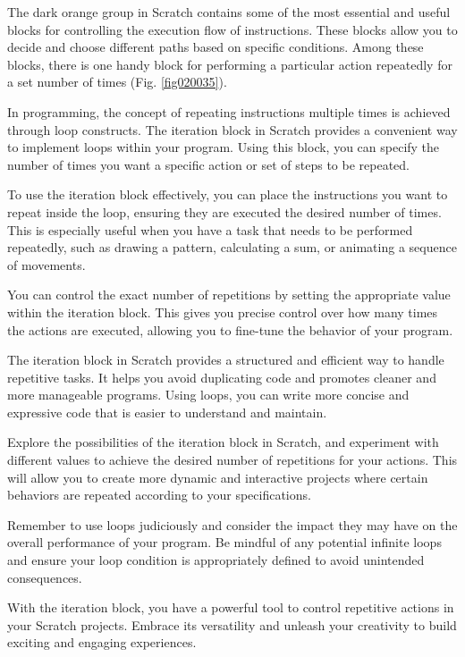 The dark orange group in Scratch contains some of the most essential and useful blocks for controlling the execution flow of instructions. These blocks allow you to decide and choose different paths based on specific conditions. Among these blocks, there is one handy block for performing a particular action repeatedly for a set number of times (Fig. \ref{fig020035}).

In programming, the concept of repeating instructions multiple times is achieved through loop constructs. The iteration block in Scratch provides a convenient way to implement loops within your program. Using this block, you can specify the number of times you want a specific action or set of steps to be repeated.

To use the iteration block effectively, you can place the instructions you want to repeat inside the loop, ensuring they are executed the desired number of times. This is especially useful when you have a task that needs to be performed repeatedly, such as drawing a pattern, calculating a sum, or animating a sequence of movements.

You can control the exact number of repetitions by setting the appropriate value within the iteration block. This gives you precise control over how many times the actions are executed, allowing you to fine-tune the behavior of your program.

The iteration block in Scratch provides a structured and efficient way to handle repetitive tasks. It helps you avoid duplicating code and promotes cleaner and more manageable programs. Using loops, you can write more concise and expressive code that is easier to understand and maintain.

Explore the possibilities of the iteration block in Scratch, and experiment with different values to achieve the desired number of repetitions for your actions. This will allow you to create more dynamic and interactive projects where certain behaviors are repeated according to your specifications.

Remember to use loops judiciously and consider the impact they may have on the overall performance of your program. Be mindful of any potential infinite loops and ensure your loop condition is appropriately defined to avoid unintended consequences.

With the iteration block, you have a powerful tool to control repetitive actions in your Scratch projects. Embrace its versatility and unleash your creativity to build exciting and engaging experiences.

